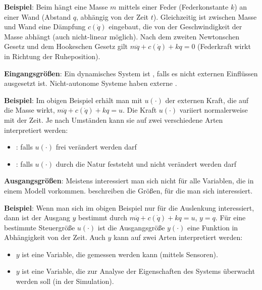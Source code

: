 \textbf{Beispiel}:
Beim  hängt eine Masse $m$ mittels
einer Feder (Federkonstante $k$) an einer Wand (Abstand $q$, abhängig von der Zeit $t$).
Gleichzeitig ist zwischen Masse und Wand eine Dämpfung $c(\dot{q})$ eingebaut, die von der
Geschwindigkeit der Masse abhängt (auch nicht-linear möglich).
Nach dem zweiten Newtonschen Gesetz und dem Hookeschen Gesetz gilt
$m \ddot{q} + c(\dot{q}) + kq = 0$
(Federkraft wirkt in Richtung der Ruheposition).

\linie

\textbf{Eingangsgrößen}:
Ein dynamisches System ist ,
falls es nicht externen Einflüssen ausgesetzt ist.
Nicht-autonome Systeme haben externe .

\textbf{Beispiel}:
Im obigen Beispiel erhält man mit $u(\cdot)$ der externen Kraft, die auf die Masse wirkt,
$m \ddot{q} + c(\dot{q}) + kq = u$.
Die Kraft $u(\cdot)$ variiert normalerweise mit der Zeit.
Je nach Umständen kann sie auf zwei verschiedene Arten interpretiert werden:
\begin{itemize}
    \item
    :
    falls $u(\cdot)$ frei verändert werden darf

    \item
    :
    falls $u(\cdot)$ durch die Natur feststeht und nicht verändert werden darf
\end{itemize}

\linie

\textbf{Ausgangsgrößen}:
Meistens interessiert man sich nicht für alle Variablen, die in einem Modell vorkommen.
 beschreiben die Größen, für die man sich interessiert.

\textbf{Beispiel}:
Wenn man sich im obigen Beispiel nur für die Auslenkung interessiert, dann ist der
Ausgang $y$ bestimmt durch $m \ddot{q} + c(\dot{q}) + kq = u$, $y = q$.
Für eine bestimmte Steuergröße $u(\cdot)$ ist die Ausgangsgröße $y(\cdot)$ eine Funktion in
Abhängigkeit von der Zeit.
Auch $y$ kann auf zwei Arten interpretiert werden:
\begin{itemize}
    \item
    $y$ ist eine Variable, die gemessen werden kann (mittels Sensoren).

    \item
    $y$ ist eine Variable, die zur Analyse der Eigenschaften des Systems überwacht werden soll
    (in der Simulation).
\end{itemize}

